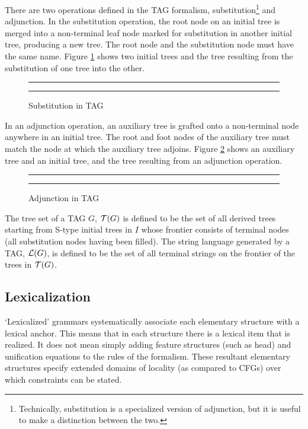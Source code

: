 There are two operations defined in the TAG formalism,
substitution\footnote{Technically, substitution is a specialized version of
adjunction, but it is useful to make a distinction between the two.} and
adjunction.  In the substitution operation, the root node on an initial tree is
merged into a non-terminal leaf node marked for substitution in another initial
tree, producing a new tree.  The root node and the substitution node must have
the same name.  Figure \ref{proto-subst} shows two initial trees and the tree
resulting from the substitution of one tree into the other.

\begin{figure}[ht]
\centering
\rule[.1in]{\textwidth}{0.01in} 
\caption{Substitution in TAG}
\rule[.1in]{\textwidth}{0.01in} 
\label{proto-subst}
\end{figure}

In an adjunction operation, an auxiliary tree is grafted onto a non-terminal
node anywhere in an initial tree.  The root and foot nodes of the auxiliary
tree must match the node at which the auxiliary tree adjoins.  Figure
\ref{proto-adjunction} shows an auxiliary tree and an initial tree, and the
tree resulting from an adjunction operation.

\begin{figure}[ht]
\centering
\rule[.1in]{\textwidth}{0.01in} 
\caption{Adjunction in TAG}
\rule[.1in]{\textwidth}{0.01in} 
\label{proto-adjunction}
\end{figure}

The tree set of a TAG $G$, ${\cal T}(G)$ is defined to be the set
of all derived trees starting from S-type initial trees in $I$ whose frontier
consists of terminal nodes (all substitution nodes having been filled). The
string language generated by a TAG, ${\cal L}(G)$, is defined to be the
set of all terminal strings on the frontier of the trees in ${\cal T}(G)$.

\subsection{Lexicalization}

`Lexicalized' grammars systematically associate each elementary structure with
a lexical anchor. This means that in each structure there is a lexical item
that is realized.  It does not mean simply adding feature structures (such as
head) and unification equations to the rules of the formalism.  These resultant
elementary structures specify extended domains of locality (as compared to
CFGs) over which constraints can be stated.

